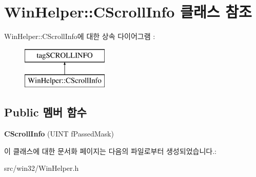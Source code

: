 \hypertarget{class_win_helper_1_1_c_scroll_info}{}\section{Win\+Helper\+:\+:C\+Scroll\+Info 클래스 참조}
\label{class_win_helper_1_1_c_scroll_info}
Win\+Helper\+:\+:C\+Scroll\+Info에 대한 상속 다이어그램 \+: \begin{figure}[H]
\begin{center}
\leavevmode
\includegraphics[height=2.000000cm]{class_win_helper_1_1_c_scroll_info}
\end{center}
\end{figure}
\subsection*{Public 멤버 함수}
\begin{DoxyCompactItemize}
\item 
\mbox{\label{class_win_helper_1_1_c_scroll_info_afc8fca26c959c0c5d70dc19c71333a1e}} 
{\bfseries C\+Scroll\+Info} (U\+I\+NT f\+Passed\+Mask)
\end{DoxyCompactItemize}


이 클래스에 대한 문서화 페이지는 다음의 파일로부터 생성되었습니다.\+:\begin{DoxyCompactItemize}
\item 
src/win32/Win\+Helper.\+h\end{DoxyCompactItemize}
